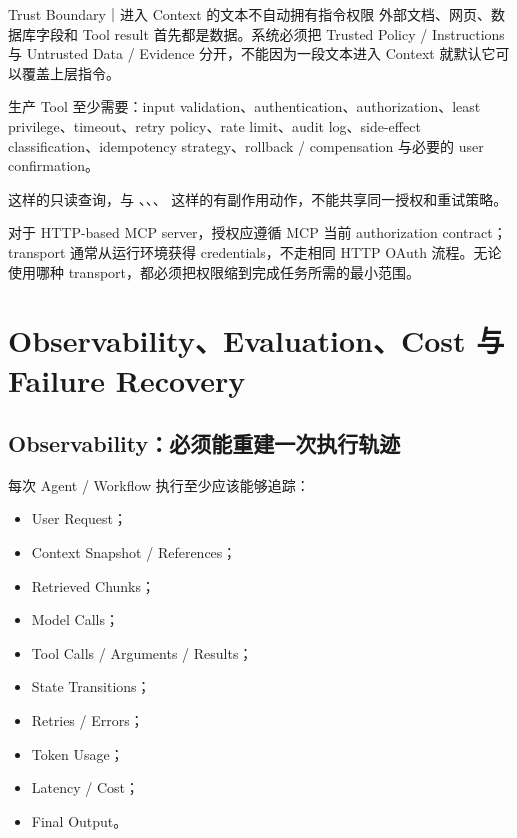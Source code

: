 \documentclass[profile=standard,twoside=false]{ipara-handbook}
\begin{document}
\begin{warning}{Trust Boundary｜进入 Context 的文本不自动拥有指令权限}
外部文档、网页、数据库字段和 Tool result 首先都是数据。系统必须把 Trusted Policy / Instructions 与 Untrusted Data / Evidence 分开，不能因为一段文本进入 Context 就默认它可以覆盖上层指令。
\end{warning}

生产 Tool 至少需要：input validation、authentication、authorization、least privilege、timeout、retry policy、rate limit、audit log、side-effect classification、idempotency strategy、rollback / compensation 与必要的 user confirmation。

 这样的只读查询，与 、、、 这样的有副作用动作，不能共享同一授权和重试策略。

对于 HTTP-based MCP server，授权应遵循 MCP 当前 authorization contract； transport 通常从运行环境获得 credentials，不走相同 HTTP OAuth 流程。无论使用哪种 transport，都必须把权限缩到完成任务所需的最小范围。

\section{Observability、Evaluation、Cost 与 Failure Recovery}

\subsection{Observability：必须能重建一次执行轨迹}

每次 Agent / Workflow 执行至少应该能够追踪：

\begin{itemize}
  \item User Request；
  \item Context Snapshot / References；
  \item Retrieved Chunks；
  \item Model Calls；
  \item Tool Calls / Arguments / Results；
  \item State Transitions；
  \item Retries / Errors；
  \item Token Usage；
  \item Latency / Cost；
  \item Final Output。
\end{itemize}
\end{document}
